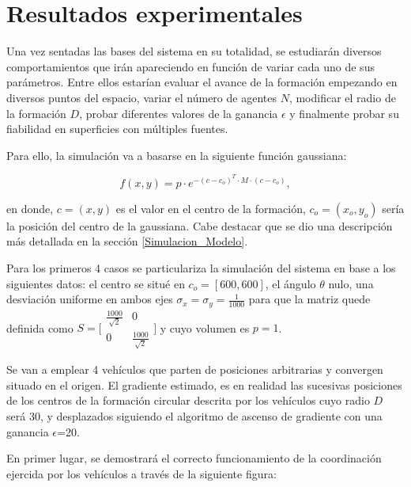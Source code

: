 
\chapter{Resultados experimentales}
\label{ch:chapter3}

Una vez sentadas las bases del sistema en su totalidad, se estudiarán diversos comportamientos que irán apareciendo en función de variar cada uno de sus parámetros. Entre ellos estarían evaluar el avance de la formación empezando en diversos puntos del espacio, variar el número de agentes $N$, modificar el radio de la formación $D$, probar diferentes valores de la ganancia $\epsilon$ y finalmente probar su fiabilidad en superficies con múltiples fuentes.

Para ello, la simulación va a basarse en la  siguiente función gaussiana:

\begin{equation}\label{Funcion_Gaussiana_2} 
	f\left(x,y\right) = p\cdot{e}^{-\left(c-c_o\right)^{T}\cdot{M}\cdot\left(c-c_{o}\right)},
\end{equation}

en donde, $c=\left(x,y\right)$ es el valor en el centro de la formación, $c_o=\left(x_{o},y_{o}\right)$ sería la posición del centro de la gaussiana. Cabe destacar que se dio una descripción más detallada en la sección \ref{Simulacion_Modelo}.

Para los primeros 4 casos se particulariza la simulación del sistema en base a los siguientes datos: el centro se situé en $c_{o}=[600,600]$, el ángulo $\theta$ nulo, una desviación uniforme en ambos ejes $\sigma_{x}=\sigma_{y}=\frac{1}{1000}$ para que la matriz quede definida como $S = \bigl[\begin{smallmatrix}\frac{1000}{\sqrt{2}} & 0\\ 0 & \frac{1000}{\sqrt{2}}\end{smallmatrix}\bigr]$  y cuyo volumen es $p = 1$.

Se van a emplear 4 vehículos que parten de posiciones arbitrarias y convergen situado en el origen. El gradiente estimado, es en realidad las sucesivas posiciones de los centros de la formación circular descrita por los vehículos cuyo radio $D$ será 30, y desplazados siguiendo el algoritmo de ascenso de gradiente con una ganancia $\epsilon$=20.

En primer lugar, se demostrará el correcto funcionamiento de la coordinación ejercida por los vehículos a través de la siguiente figura:

